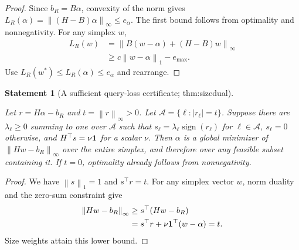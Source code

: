 \documentclass[11pt]{article}
\newtheorem{statement}{Statement}
\newcommand{\norm}[1]{\left\lVert#1\right\rVert}\newcommand{\qh}{\widehat H}
\begin{document}
\begin{proof}
Since $b_R=B\alpha$, convexity of the norm gives $L_R(\alpha)=\norm{(H-B)\alpha}_\infty\le e_\alpha$. The first bound follows from optimality and nonnegativity. For any simplex $w$,
\begin{align}
L_R(w)&=\norm{B(w-\alpha)+(H-B)w}_\infty\\
&\ge c\norm{w-\alpha}_1-e_{\max}.
\end{align}
Use $L_R(w^*)\le L_R(\alpha)\le e_\alpha$ and rearrange.
\end{proof}

\begin{statement}[A sufficient query-loss certificate; thm:sizedual]\label{thm:sizedual}

Let $r=H\alpha-b_R$ and $t=\norm r_\infty>0$. Let $\mathcal A=\{\ell:|r_\ell|=t\}$. Suppose there are $\lambda_\ell\ge0$ summing to one over $\mathcal A$ such that $s_\ell=\lambda_\ell\operatorname{sign}(r_\ell)$ for $\ell\in\mathcal A$, $s_\ell=0$ otherwise, and $H^\top s=\nu\mathbf 1$ for a scalar $\nu$. Then $\alpha$ is a global minimizer of $\norm{Hw-b_R}_\infty$ over the entire simplex, and therefore over any feasible subset containing it. If $t=0$, optimality already follows from nonnegativity.

\end{statement}

\begin{proof}
We have $\norm s_1=1$ and $s^\top r=t$. For any simplex vector $w$, norm duality and the zero-sum constraint give
\begin{align}
\norm{Hw-b_R}_\infty
&\ge s^\top(Hw-b_R)\\
&=s^\top r+\nu\ind^\top(w-\alpha)=t.
\end{align}
Size weights attain this lower bound.
\end{proof}
\end{document}
